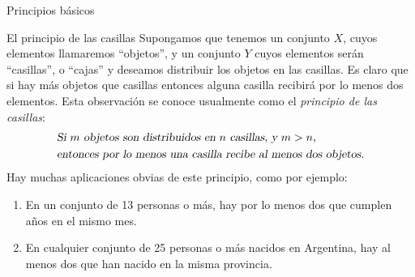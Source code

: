 \documentclass[11pt,spanish,makeidx]{amsbook}
\theoremstyle{definition}
\theoremstyle{remark}
\begin{document}
\begin{section}{Principios básicos}
\begin{subsection}{El principio de las casillas}
	Supongamos que tenemos un conjunto $X$, cuyos elementos llamaremos ``objetos'', y un conjunto $Y$ cuyos elementos serán ``casillas'', o ``cajas'' y deseamos distribuir los objetos en las casillas. Es claro que si hay más objetos que casillas entonces alguna casilla recibirá por lo menos dos elementos. Esta observación se conoce usualmente como el \textit{{principio de las casillas}}:
	$$\begin{aligned}
	&\text{\sl Si $m$ objetos son distribuidos en $n$ casillas, y $m > n$,} \\
	&\text{\sl entonces por lo menos una casilla recibe al menos dos
		objetos.}
	\end{aligned}
	$$
	Hay muchas aplicaciones obvias de este principio, como por 	ejemplo:
	
	\begin{enumerate}
		\item En un conjunto de 13 personas o más, hay por lo menos dos que cumplen años en el mismo mes.
		\item En cualquier conjunto de 25 personas o más nacidos en 	Argentina, hay al menos dos que han nacido en la misma provincia.
	\end{enumerate}
	
	
\end{subsection}

\end{section}
\end{document}
